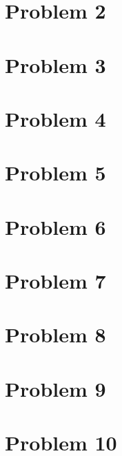 \documentclass[11pt,letterpaper]{article}
\begin{document}
\section{Problem 2}

\section{Problem 3}

\section{Problem 4}

\section{Problem 5}

\section{Problem 6}

\section{Problem 7}

\section{Problem 8}

\section{Problem 9}

\section{Problem 10}
\end{document}
